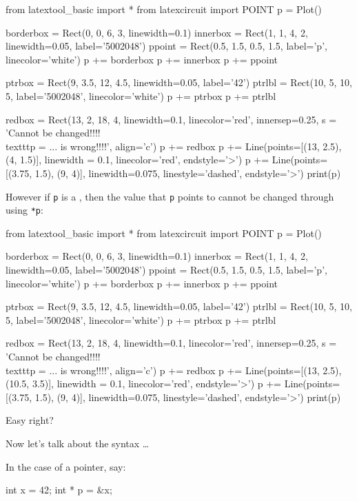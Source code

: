 \begin{python}
from latextool_basic import *
from latexcircuit import POINT
p = Plot()

borderbox = Rect(0, 0, 6, 3, linewidth=0.1)
innerbox = Rect(1, 1, 4, 2, linewidth=0.05, label='5002048')
ppoint = Rect(0.5, 1.5, 0.5, 1.5, label='p', linecolor='white')
p += borderbox
p += innerbox
p += ppoint

ptrbox = Rect(9, 3.5, 12, 4.5, linewidth=0.05, label='42')
ptrlbl = Rect(10, 5, 10, 5, label='5002048', linecolor='white')
p += ptrbox
p += ptrlbl

redbox = Rect(13, 2, 18, 4, linewidth=0.1, linecolor='red', innersep=0.25, s = 'Cannot be changed!!!! \\texttt{p = ...} is wrong!!!!', align='c')
p += redbox
p += Line(points=[(13, 2.5), (4, 1.5)], linewidth = 0.1, linecolor='red', endstyle='>')
p += Line(points=[(3.75, 1.5), (9, 4)], linewidth=0.075, linestyle='dashed', endstyle='>')
print(p)
\end{python}

However if \texttt{p} is a , then the value that \texttt{p} points to cannot be changed through using \texttt{*p}:

\begin{python}
from latextool_basic import *
from latexcircuit import POINT
p = Plot()

borderbox = Rect(0, 0, 6, 3, linewidth=0.1)
innerbox = Rect(1, 1, 4, 2, linewidth=0.05, label='5002048')
ppoint = Rect(0.5, 1.5, 0.5, 1.5, label='p', linecolor='white')
p += borderbox
p += innerbox
p += ppoint

ptrbox = Rect(9, 3.5, 12, 4.5, linewidth=0.05, label='42')
ptrlbl = Rect(10, 5, 10, 5, label='5002048', linecolor='white')
p += ptrbox
p += ptrlbl

redbox = Rect(13, 2, 18, 4, linewidth=0.1, linecolor='red', innersep=0.25, s = 'Cannot be changed!!!! \\texttt{p = ...} is wrong!!!!', align='c')
p += redbox
p += Line(points=[(13, 2.5), (10.5, 3.5)], linewidth = 0.1, linecolor='red', endstyle='>')
p += Line(points=[(3.75, 1.5), (9, 4)], linewidth=0.075, linestyle='dashed', endstyle='>')
print(p)
\end{python}

Easy right?

Now let's talk about the syntax \ldots{}

In the case of a pointer, say:

\begin{consolethree}[escapeinside=||]
int x = 42;
int * p = &x;
\end{consolethree}

